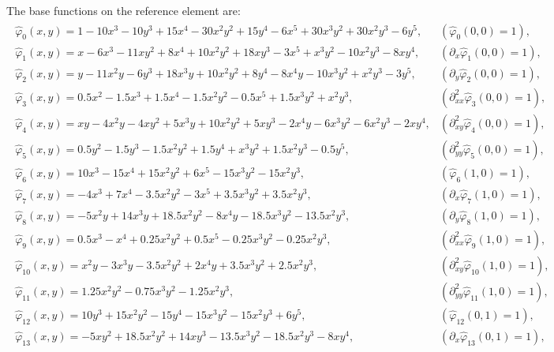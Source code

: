 \documentclass[a4paper,11pt,english]{sphinxmanual}
\begin{document}
The base functions on the reference element are:
\begin{equation*}
\begin{split}\begin{array}{ll}
\widehat{\varphi}_{0}(x,y) = 1 - 10x^3 - 10y^3 + 15x^4 - 30x^2y^2 + 15y^4 - 6x^5 + 30x^3y^2 + 30x^2y^3 - 6y^5, & (\widehat{\varphi}_0(0,0) = 1), \\
\widehat{\varphi}_{1}(x,y) = x - 6x^3 - 11xy^2 + 8x^4 + 10x^2y^2 + 18xy^3 - 3x^5 + x^3y^2 - 10x^2y^3 - 8xy^4, & (\partial_x\widehat{\varphi}_1(0,0) = 1),\\
\widehat{\varphi}_{2}(x,y) = y - 11x^2y - 6y^3 + 18x^3y + 10x^2y^2 + 8y^4 - 8x^4y - 10x^3y^2 + x^2y^3 - 3y^5, & (\partial_y\widehat{\varphi}_2(0,0) = 1),\\
\widehat{\varphi}_{3}(x,y) = 0.5x^2 - 1.5x^3 + 1.5x^4 - 1.5x^2y^2 - 0.5x^5 + 1.5x^3y^2 + x^2y^3, & (\partial^2_{xx}\widehat{\varphi}_3(0,0) = 1),\\
\widehat{\varphi}_{4}(x,y) = xy - 4x^2y - 4xy^2 + 5x^3y + 10x^2y^2 + 5xy^3 - 2x^4y - 6x^3y^2 - 6x^2y^3 - 2xy^4, & (\partial^2_{xy}\widehat{\varphi}_{4}(0,0) = 1),\\
\widehat{\varphi}_{5}(x,y) = 0.5y^2 - 1.5y^3 - 1.5x^2y^2 + 1.5y^4 + x^3y^2 + 1.5x^2y^3 - 0.5y^5, & (\partial^2_{yy}\widehat{\varphi}_{5}(0,0) = 1),\\
\widehat{\varphi}_{6}(x,y) = 10x^3 - 15x^4 + 15x^2y^2 + 6x^5 - 15x^3y^2 - 15x^2y^3, & (\widehat{\varphi}_6(1,0) = 1),\\
\widehat{\varphi}_{7}(x,y) = -4x^3 + 7x^4 - 3.5x^2y^2 - 3x^5 + 3.5x^3y^2 + 3.5x^2y^3, & (\partial_x\widehat{\varphi}_7(1,0) = 1),\\
\widehat{\varphi}_{8}(x,y) = -5x^2y + 14x^3y + 18.5x^2y^2 - 8x^4y - 18.5x^3y^2 - 13.5x^2y^3, & (\partial_y\widehat{\varphi}_8(1,0) = 1),\\
\widehat{\varphi}_{9}(x,y) = 0.5x^3 - x^4 + 0.25x^2y^2 + 0.5x^5 - 0.25x^3y^2 - 0.25x^2y^3, & (\partial^2_{xx}\widehat{\varphi}_{9}(1,0) = 1),\\
\widehat{\varphi}_{10}(x,y) = x^2y - 3x^3y - 3.5x^2y^2 + 2x^4y + 3.5x^3y^2 + 2.5x^2y^3, & (\partial^2_{xy}\widehat{\varphi}_{10}(1,0) = 1),\\
\widehat{\varphi}_{11}(x,y) = 1.25x^2y^2 - 0.75x^3y^2 - 1.25x^2y^3, & (\partial^2_{yy}\widehat{\varphi}_{11}(1,0) = 1),\\
\widehat{\varphi}_{12}(x,y) = 10y^3 + 15x^2y^2 - 15y^4 - 15x^3y^2 - 15x^2y^3 + 6y^5, & (\widehat{\varphi}_{12}(0,1) = 1),\\
\widehat{\varphi}_{13}(x,y) = -5xy^2 + 18.5x^2y^2 + 14xy^3 - 13.5x^3y^2 - 18.5x^2y^3 - 8xy^4, & (\partial_x\widehat{\varphi}_{13}(0,1) = 1),\\

\end{array}
\end{split}
\end{equation*}
\end{document}
